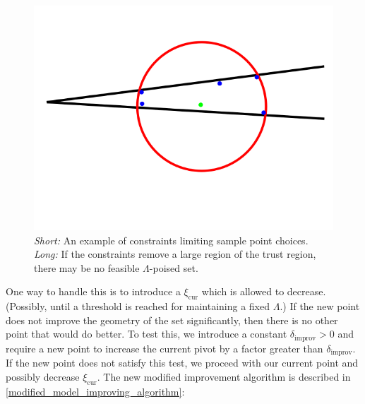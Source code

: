 \begin{figure}[ht]
    \centering
    \includegraphics[scale=0.4]{images/bad_lambda.png}
    \caption{
    	\emph{Short:} An example of constraints limiting sample point choices.
    	\emph{Long:} If the constraints remove a large region of the trust region, there may be no feasible $\Lambda$-poised set.
    }
    \label{lspc}
\end{figure}


One way to handle this is to introduce a $\xi_{\text{cur}}$ which is allowed to decrease.
(Possibly, until a threshold is reached for maintaining a fixed $\Lambda$.)
If the new point does not improve the geometry of the set significantly, then there is no other point that would do better.
To test this, we introduce a constant $\delta_{\text{improv}}>0$ and require a new point to increase the current pivot by a factor greater than $\delta_{\text{improv}}$.
If the new point does not satisfy this test, we proceed with our current point and possibly decrease $\xi_{\text{cur}}$.
The new modified improvement algorithm is described in \cref{modified_model_improving_algorithm}:

